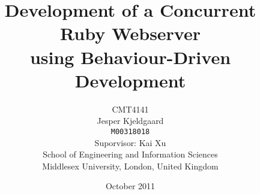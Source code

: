\title{Development of a Concurrent Ruby Webserver\\ using Behaviour-Driven
  Development}
\author{CMT4141\\
Jesper Kjeldgaard\\
\small \texttt{M00318018}\\
\small Suporvisor: Kai Xu\\
\small School of Engineering and Information Sciences\\[-0.8ex]
\small Middlesex University, London, United Kingdom\\
}
\date{October 2011}
\maketitle
